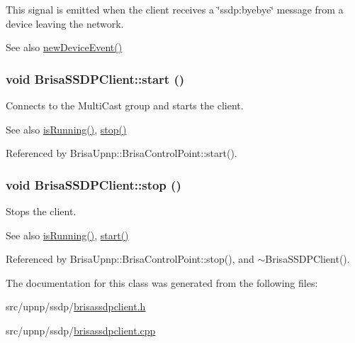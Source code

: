 This signal is emitted when the client receives a \char`\"{}ssdp:byebye\char`\"{} message from a device leaving the network. \begin{DoxySeeAlso}{See also}
\hyperlink{classBrisaUpnp_1_1BrisaSSDPClient_adc61d6338504d3e47dc68712bbd77b23}{newDeviceEvent()} 
\end{DoxySeeAlso}
\hypertarget{classBrisaUpnp_1_1BrisaSSDPClient_a4cbb8b895e02598ad9a812822240b455}{
\subsubsection[{start}]{\setlength{\rightskip}{0pt plus 5cm}void BrisaSSDPClient::start ()}}
\label{classBrisaUpnp_1_1BrisaSSDPClient_a4cbb8b895e02598ad9a812822240b455}


Connects to the MultiCast group and starts the client. \begin{DoxySeeAlso}{See also}
\hyperlink{classBrisaUpnp_1_1BrisaSSDPClient_ae2aebc6140ce5e88172f42c0c6958922}{isRunning()}, \hyperlink{classBrisaUpnp_1_1BrisaSSDPClient_aea1fe16f28140943d0abfd464b42a8b9}{stop()} 
\end{DoxySeeAlso}


Referenced by BrisaUpnp::BrisaControlPoint::start().\hypertarget{classBrisaUpnp_1_1BrisaSSDPClient_aea1fe16f28140943d0abfd464b42a8b9}{
\subsubsection[{stop}]{\setlength{\rightskip}{0pt plus 5cm}void BrisaSSDPClient::stop ()}}
\label{classBrisaUpnp_1_1BrisaSSDPClient_aea1fe16f28140943d0abfd464b42a8b9}


Stops the client. \begin{DoxySeeAlso}{See also}
\hyperlink{classBrisaUpnp_1_1BrisaSSDPClient_ae2aebc6140ce5e88172f42c0c6958922}{isRunning()}, \hyperlink{classBrisaUpnp_1_1BrisaSSDPClient_a4cbb8b895e02598ad9a812822240b455}{start()} 
\end{DoxySeeAlso}


Referenced by BrisaUpnp::BrisaControlPoint::stop(), and $\sim$BrisaSSDPClient().

The documentation for this class was generated from the following files:\begin{DoxyCompactItemize}
\item 
src/upnp/ssdp/\hyperlink{brisassdpclient_8h}{brisassdpclient.h}\item 
src/upnp/ssdp/\hyperlink{brisassdpclient_8cpp}{brisassdpclient.cpp}\end{DoxyCompactItemize}
